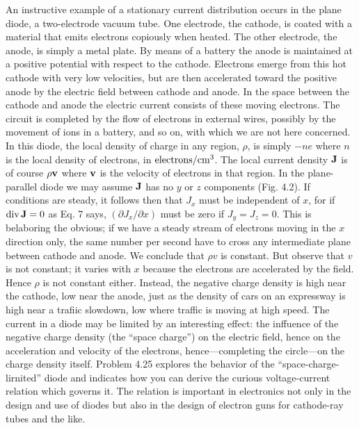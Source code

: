 An instructive example of a stationary current distribution occurs
in the plane diode, a two-electrode vacuum tube. One electrode, the
cathode, is coated with a material that emits electrons copiously
when heated. The other electrode, the anode, is simply a metal plate.
By means of a battery the anode is maintained at a positive potential
with respect to the cathode. Electrons emerge from this hot
cathode with very low velocities, but are then accelerated toward the
positive anode by the electric field between cathode and anode. In
the space between the cathode and anode the electric current consists
of these moving electrons. The circuit is completed by the flow
of electrons in external wires, possibly by the movement of ions in
a battery, and so on, with which we are not here concerned. In this
diode, the local density of charge in any region, $\rho$, is simply $-ne$
where $n$ is the local density of electrons, in $\textup{electrons}/\textup{cm}^3$. The local
current density $\mathbf{J}$ is of course $\rho \mathbf{v}$ where $\mathbf{v}$ is the velocity of electrons
in that region. In the plane-parallel diode we may assume $\mathbf{J}$ has no
$y$ or $z$ components (Fig. 4.2). If conditions are steady, it follows
then that $J_x$ must be independent of $x$, for if $\operatorname{div}\mathbf{J} = 0$ as Eq. 7 says,
$(\partial J_x/\partial x)$ must be zero if $J_y = J_z = 0$. This is belaboring the obvious;
if we have a steady stream of electrons moving in the $x$ direction
only, the same number per second have to cross any intermediate
plane between cathode and anode. We conclude that $\rho v$ is constant.
But observe that $v$ is not constant; it varies with $x$ because the electrons
are accelerated by the field. Hence $\rho$ is not constant either.
Instead, the negative charge density is high near the cathode, low
near the anode, just as the density of cars on an expressway is high
near a trafiic slowdown, low where traffic is moving at high speed.
The current in a diode may be limited by an interesting effect: the
inffuence of the negative charge density (the ``space charge'') on the
electric field, hence on the acceleration and velocity of the electrons,
hence---completing the circle---on the charge density itself. 
Problem 4.25 explores the behavior of the ``space-charge-lirnited'' diode
and indicates how you can derive the curious voltage-current relation
which governs it. The relation is important in electronics not only
in the design and use of diodes but also in the design of electron guns
for cathode-ray tubes and the like.

\iffalse

